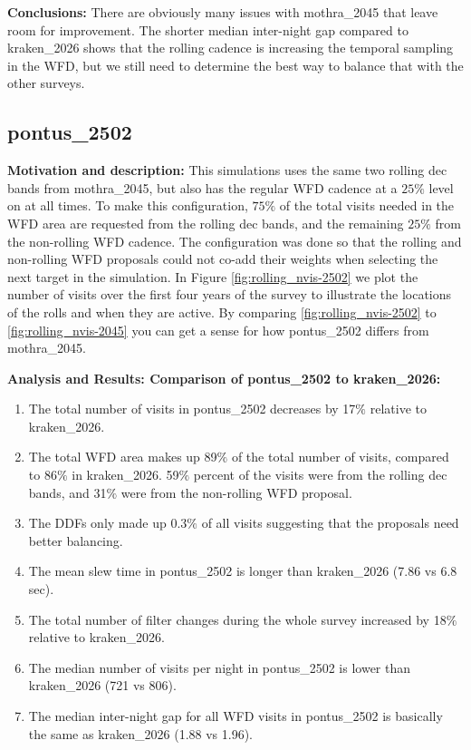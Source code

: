 \documentclass[DM,lsstdraft,authoryear,toc]{lsstdoc}
\begin{document}
\textbf{Conclusions:} There are obviously many issues with mothra\_2045 that leave room for improvement. The shorter median inter-night
gap compared to kraken\_2026 shows that the rolling cadence is increasing the temporal sampling in the WFD, but we still need to determine
the best way to balance that with the other surveys.

\subsection{pontus\_2502} \label{pontus2502}

\textbf{Motivation and description:} This simulations uses the same two rolling dec bands from mothra\_2045, but also has the
regular WFD cadence at a $25\%$ level on at all times. To make this configuration, $75\%$ of the total visits needed in the WFD area are requested from the
rolling dec bands, and the remaining $25\%$ from the non-rolling WFD cadence. The configuration was done so that the rolling and non-rolling WFD 
proposals could not co-add their weights when selecting the next target in the simulation. In Figure \autoref{fig:rolling_nvis-2502} we plot the number 
of visits over the first four years of the survey to illustrate the locations of the rolls and when they are active. By comparing \autoref{fig:rolling_nvis-2502} 
to \autoref{fig:rolling_nvis-2045} you can get a sense for how pontus\_2502 differs from mothra\_2045.

\textbf{Analysis and Results: Comparison of pontus\_2502 to kraken\_2026:}


\begin{enumerate}
\item The total number of visits in pontus\_2502 decreases by 17$\%$ relative to kraken\_2026.
\item The total WFD area makes up 89$\%$ of the total number of visits, compared to 86$\%$ in kraken\_2026.
59$\%$ percent of the visits were from the rolling dec bands, and 31$\%$ were from the non-rolling WFD proposal.
\item The DDFs only made up  0.3$\%$ of all visits suggesting that the proposals need better balancing. 
\item The mean slew time in pontus\_2502 is longer than kraken\_2026 (7.86 vs 6.8 sec). 
\item The total number of filter changes during the whole survey increased by 18$\%$ relative to kraken\_2026.
\item The median number of visits per night in pontus\_2502 is lower than kraken\_2026 (721 vs 806). 
\item The median inter-night gap for all WFD visits in pontus\_2502 is basically the same as kraken\_2026  (1.88 vs 1.96).
\end{enumerate}
\end{document}
